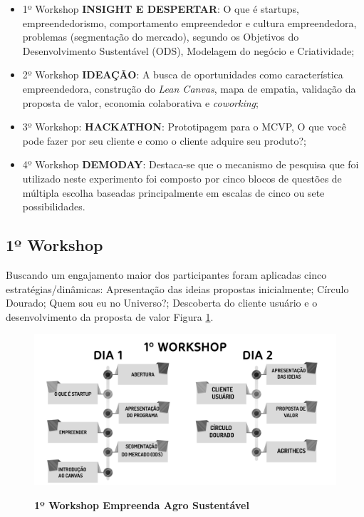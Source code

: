 \begin{itemize}

\item {1º Workshop \textbf{INSIGHT E DESPERTAR}: O que é startups, empreendedorismo, comportamento empreendedor e cultura empreendedora, problemas (segmentação do mercado), segundo os Objetivos do Desenvolvimento Sustentável (ODS), Modelagem do negócio e Criatividade;}
\item {2º Workshop \textbf{IDEAÇÃO}: A busca de oportunidades como característica empreendedora, construção do \textit{\textit{Lean Canvas}}, mapa de empatia, validação da proposta de valor, economia colaborativa e \textit{coworking};}

\item {3º Workshop: \textbf{HACKATHON}: Prototipagem para o MCVP, O que você pode fazer por seu cliente e como o cliente adquire seu produto?;}

\item {4º Workshop \textbf{DEMODAY}: Destaca-se que o mecanismo de pesquisa que foi utilizado neste experimento foi composto por cinco blocos de questões de múltipla escolha baseadas principalmente em escalas de cinco ou sete possibilidades.}
\end{itemize}


\subsection{1º Workshop}

Buscando um engajamento maior dos participantes foram
aplicadas cinco estratégias/dinâmicas: Apresentação das ideias propostas inicialmente; Círculo Dourado;
Quem sou eu no Universo?; Descoberta do cliente usuário e o  desenvolvimento da proposta de valor Figura \ref{figura_30}.

\begin{figure}[!h]
\centering
\caption{\textbf{1º Workshop Empreenda Agro Sustentável}}
\includegraphics[scale=0.4]{Imagens/workshop-01.png}
\label{figura_30}
\end{figure}

